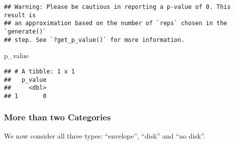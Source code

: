 \documentclass[]{article}
\newenvironment{Shaded}{\begin{snugshade}}{\end{snugshade}}
\newcommand{\DataTypeTok}[1]{\textcolor[rgb]{0.13,0.29,0.53}{#1}}
\newcommand{\DecValTok}[1]{\textcolor[rgb]{0.00,0.00,0.81}{#1}}
\newcommand{\KeywordTok}[1]{\textcolor[rgb]{0.13,0.29,0.53}{\textbf{#1}}}
\newcommand{\NormalTok}[1]{#1}
\newcommand{\OperatorTok}[1]{\textcolor[rgb]{0.81,0.36,0.00}{\textbf{#1}}}
\newcommand{\StringTok}[1]{\textcolor[rgb]{0.31,0.60,0.02}{#1}}
\begin{document}
\begin{Shaded}
\end{Shaded}

\begin{verbatim}
## Warning: Please be cautious in reporting a p-value of 0. This result is
## an approximation based on the number of `reps` chosen in the `generate()`
## step. See `?get_p_value()` for more information.
\end{verbatim}

\begin{Shaded}
\begin{Highlighting}[]
\NormalTok{p_value}
\end{Highlighting}
\end{Shaded}

\begin{verbatim}
## # A tibble: 1 x 1
##   p_value
##     <dbl>
## 1       0
\end{verbatim}

\hypertarget{more-than-two-categories-1}{%
\subsubsection{More than two
Categories}\label{more-than-two-categories-1}}

We now consider all three types: ``envelope'', ``disk'' and ``no disk''.
\end{document}
